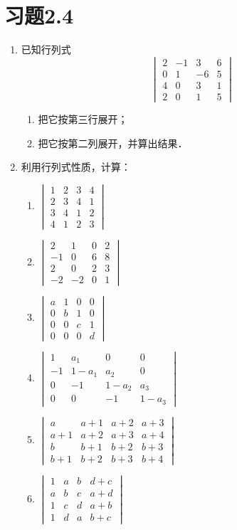 \section*{习题2.4}
\begin{enumerate}
    \item 已知行列式
\[\begin{vmatrix}
    2 &-1&3&6\\
    0&1&-6&5\\
    4&0&3&1\\
    2&0&1&5
\end{vmatrix}\]
    \begin{enumerate}
        \item 把它按第三行展开；
        \item 把它按第二列展开，并算出结果．
    \end{enumerate}
\item 利用行列式性质，计算：
\begin{multicols}{2}
\begin{enumerate}
    \item $\begin{vmatrix}
   1&2&3&4\\2&3&4&1\\3&4&1&2\\4&1&2&3     
    \end{vmatrix}$
    \item $\begin{vmatrix}
        2&1&0&2\\-1&0&6&8\\2&0&2&3\\-2&-2&0&1
    \end{vmatrix}$
    \item $\begin{vmatrix}
        a&1&0&0\\0&b&1&0\\0&0&c&1\\0&0&0&d
    \end{vmatrix}$
    \item $\begin{vmatrix}
        1&a_1&0&0\\-1&1-a_1&a_2&0\\
        0&-1&1-a_2&a_3\\0&0&-1&1-a_3
    \end{vmatrix}$
    \item $\begin{vmatrix}
        a&a+1&a+2&a+3\\
        a+1&a+2&a+3&a+4\\
        b&b+1&b+2&b+3\\
        b+1&b+2&b+3&b+4
    \end{vmatrix}$
    \item $\begin{vmatrix}
        1&a&b&d+c\\a&b&c&a+d\\1&c&d&a+b\\1&d&a&b+c
    \end{vmatrix}$
\end{enumerate}
\end{multicols}


\end{enumerate}
